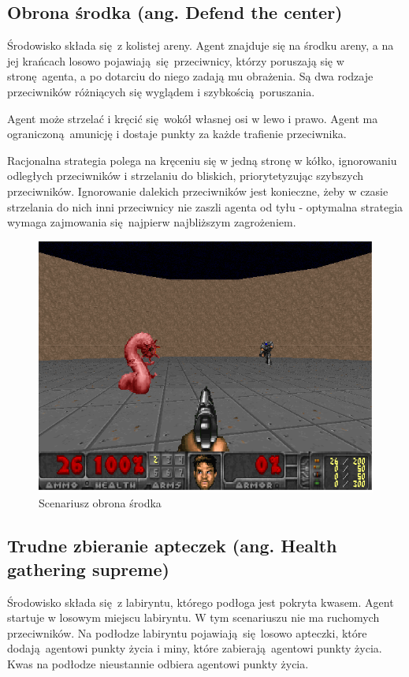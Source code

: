 \subsection{Obrona środka (ang. Defend the center)}\label{scenario_dtc}
Środowisko składa się z kolistej areny. Agent znajduje się na środku areny, a na jej krańcach losowo pojawiają się przeciwnicy, którzy poruszają się w stronę agenta, a po dotarciu do niego zadają mu obrażenia. Są dwa rodzaje przeciwników różniących się wyglądem i szybkością poruszania.

Agent może strzelać i kręcić się wokół własnej osi w lewo i prawo. Agent ma ograniczoną amunicję i dostaje punkty za każde trafienie przeciwnika.

Racjonalna strategia polega na kręceniu się w jedną stronę w kółko, ignorowaniu odległych przeciwników i strzelaniu do bliskich, priorytetyzując szybszych przeciwników. Ignorowanie dalekich przeciwników jest konieczne, żeby w czasie strzelania do nich inni przeciwnicy nie zaszli agenta od tyłu - optymalna strategia wymaga zajmowania się najpierw najbliższym zagrożeniem.

\begin{center}
\begin{figure}[H]
\includegraphics[scale = 0.4]{figures/screens/scenarios/dtc.png}{\caption{Scenariusz obrona środka}\label{fig:scenario_dtc}}
\end{figure}
\end{center}

\subsection{Trudne zbieranie apteczek (ang. Health gathering supreme) }\label{scenario_hgs}
Środowisko składa się z labiryntu, którego podłoga jest pokryta kwasem. Agent startuje w losowym miejscu labiryntu. W tym scenariuszu nie ma ruchomych przeciwników. Na podłodze labiryntu pojawiają się losowo apteczki, które dodają agentowi punkty życia i miny, które zabierają agentowi punkty życia. Kwas na podłodze nieustannie odbiera agentowi punkty życia. 

